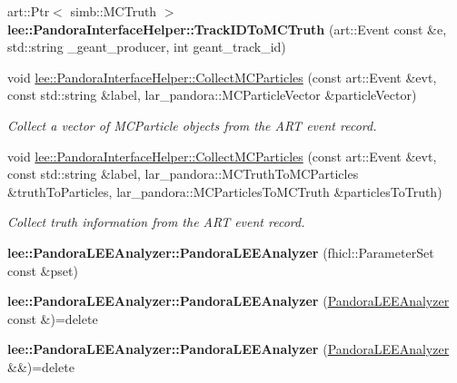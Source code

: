 \begin{DoxyCompactItemize}
\item 
\hypertarget{group__lee_gaab1841058478f2ef51067eeb588d1711}{art\-::\-Ptr$<$ simb\-::\-M\-C\-Truth $>$ {\bfseries lee\-::\-Pandora\-Interface\-Helper\-::\-Track\-I\-D\-To\-M\-C\-Truth} (art\-::\-Event const \&e, std\-::string \-\_\-geant\-\_\-producer, int geant\-\_\-track\-\_\-id)}\label{group__lee_gaab1841058478f2ef51067eeb588d1711}

\item 
void \hyperlink{group__lee_ga3a9ecae08d8a56e37cc9ef723eca6907}{lee\-::\-Pandora\-Interface\-Helper\-::\-Collect\-M\-C\-Particles} (const art\-::\-Event \&evt, const std\-::string \&label, lar\-\_\-pandora\-::\-M\-C\-Particle\-Vector \&particle\-Vector)
\begin{DoxyCompactList}\small\item\em Collect a vector of M\-C\-Particle objects from the A\-R\-T event record. \end{DoxyCompactList}\item 
void \hyperlink{group__lee_ga2c7126fa2d3a506830f25ccad4fa0b3c}{lee\-::\-Pandora\-Interface\-Helper\-::\-Collect\-M\-C\-Particles} (const art\-::\-Event \&evt, const std\-::string \&label, lar\-\_\-pandora\-::\-M\-C\-Truth\-To\-M\-C\-Particles \&truth\-To\-Particles, lar\-\_\-pandora\-::\-M\-C\-Particles\-To\-M\-C\-Truth \&particles\-To\-Truth)
\begin{DoxyCompactList}\small\item\em Collect truth information from the A\-R\-T event record. \end{DoxyCompactList}\item 
\hypertarget{group__lee_ga3783391baff0585de9261a559a8d28ef}{{\bfseries lee\-::\-Pandora\-L\-E\-E\-Analyzer\-::\-Pandora\-L\-E\-E\-Analyzer} (fhicl\-::\-Parameter\-Set const \&pset)}\label{group__lee_ga3783391baff0585de9261a559a8d28ef}

\item 
\hypertarget{group__lee_ga50f8e3ecdc7892d554c68080645af88c}{{\bfseries lee\-::\-Pandora\-L\-E\-E\-Analyzer\-::\-Pandora\-L\-E\-E\-Analyzer} (\hyperlink{classPandoraLEEAnalyzer}{Pandora\-L\-E\-E\-Analyzer} const \&)=delete}\label{group__lee_ga50f8e3ecdc7892d554c68080645af88c}

\item 
\hypertarget{group__lee_ga8e9dc3f96fcb2881bee2bfb46dcedaaf}{{\bfseries lee\-::\-Pandora\-L\-E\-E\-Analyzer\-::\-Pandora\-L\-E\-E\-Analyzer} (\hyperlink{classPandoraLEEAnalyzer}{Pandora\-L\-E\-E\-Analyzer} \&\&)=delete}\label{group__lee_ga8e9dc3f96fcb2881bee2bfb46dcedaaf}


\end{DoxyCompactItemize}
